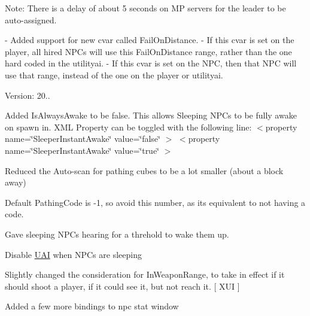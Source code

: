 \begin{DoxyVerb}    Note: There is a delay of about 5 seconds on MP servers for the leader to be auto-assigned.

- Added support for new cvar called FailOnDistance.
    - If this cvar is set on the player, all hired NPCs will use this FailOnDistance range, rather than the one hard coded in the utilityai.
    - If this cvar is set on the NPC, then that NPC will use that range, instead of the one on the player or utilityai.
\end{DoxyVerb}


Version\+: 20..
\begin{DoxyItemize}
\item Added Is\+Always\+Awake to be false. This allows Sleeping NPCs to be fully awake on spawn in. XML Property can be toggled with the following line\+: $<$property name=\char`\"{}\+Sleeper\+Instant\+Awake\char`\"{} value=\char`\"{}false\char`\"{} $>$ $<$property name=\char`\"{}\+Sleeper\+Instant\+Awake\char`\"{} value=\char`\"{}true\char`\"{} $>$
\item Reduced the Auto-\/scan for pathing cubes to be a lot smaller (about a block away)
\item Default Pathing\+Code is -\/1, so avoid this number, as its equivalent to not having a code.
\item Gave sleeping NPCs hearing for a threhold to wake them up.
\item Disable \mbox{\hyperlink{namespace_u_a_i}{UAI}} when NPCs are sleeping
\item Slightly changed the consideration for In\+Weapon\+Range, to take in effect if it should shoot a player, if it could see it, but not reach it. \mbox{[} XUI \mbox{]}
\item Added a few more bindings to npc stat window
\end{DoxyItemize}

